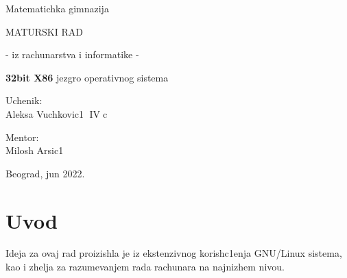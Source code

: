 \documentclass[a4paper,fleqn,12pt]{JMThesis}
\newcommand\eng{\fontencoding{OT1}\fontfamily{\rmdefault}\selectfont}
\begin{document}
\thispagestyle{empty}

\begin{center}
{\matematicka Matematichka gimnazija}
\end{center}
\vspace*{50mm}

\begin{center}
{\maturski MATURSKI RAD}

\vspace*{8pt}
{\naslov - iz rachunarstva i informatike -}
\end{center}

\vspace*{10pt}
\begin{center}
    {\naslov \textbf{\eng\Large 32bit X86} jezgro operativnog sistema}
\end{center}

\vspace*{70mm}
\setlength{\columnsep}{50pt}
\begin{multicols}{2}
 {\noindent \imen Uchenik:
\\Aleksa Vuchkovic1  $\operatorname{IV}$c}


{ \noindent \hfill \imen Mentor:\\
\hfill \phantom{aaaaaaaa} Milosh Arsic1}
\end{multicols}

\vfill
\begin{center}
{\imen Beograd, jun 2022.}
\end{center}
\clearpage

\thispagestyle{empty}
\mbox{}
\clearpage


\renewcommand{\contentsname}{Sadrzhaj}
\thispagestyle{empty}


\tableofcontents \clearpage

\thispagestyle{empty}
\mbox{}
\clearpage

\renewcommand{\chaptername}{}
\setcounter{page}{1}

\chapter{Uvod}
\bigskip

Ideja za ovaj rad proizishla je iz ekstenzivnog korish\/c1enja {\eng GNU/Linux}
sistema, kao i zhelja za razumevanjem rada rachunara na najnizhem nivou.\\
\end{document}
